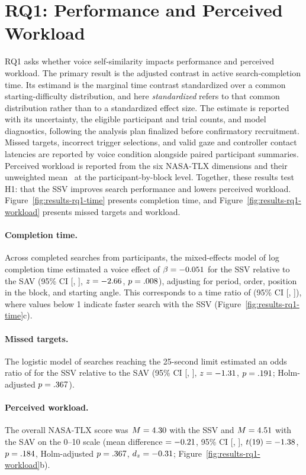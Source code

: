 \section{RQ1: Performance and Perceived Workload}
RQ1 asks whether voice self-similarity impacts performance and perceived workload. The primary result is the adjusted contrast in active search-completion time. Its estimand is the marginal time contrast standardized over a common starting-difficulty distribution, and here \emph{standardized} refers to that common distribution rather than to a standardized effect size. The estimate is reported with its uncertainty, the eligible participant and trial counts, and model diagnostics, following the analysis plan finalized before confirmatory recruitment. Missed targets, incorrect trigger selections, and valid gaze and controller contact latencies are reported by voice condition alongside paired participant summaries. Perceived workload is reported from the six NASA-TLX dimensions and their unweighted mean~\cite{hart1988nasatlx} at the participant-by-block level. Together, these results test H1: that the SSV improves search performance and lowers perceived workload. Figure~\ref{fig:results-rq1-time} presents completion time, and Figure~\ref{fig:results-rq1-workload} presents missed targets and workload.

\paragraph{Completion time.} Across \resTimeObs{} completed searches from \resN{} participants, the mixed-effects model of log completion time estimated a voice effect of $\beta = -0.051$ for the SSV relative to the SAV (95\% CI [\resTimeLo, \resTimeHi], $z = -2.66$, $p = .008$), adjusting for period, order, position in the block, and starting angle. This corresponds to a time ratio of \resTimeRatio{} (95\% CI [\resTimeRatioLo, \resTimeRatioHi]), where values below 1 indicate faster search with the SSV (Figure~\ref{fig:results-rq1-time}c).

\paragraph{Missed targets.} The logistic model of searches reaching the 25-second limit estimated an odds ratio of \resMissOR{} for the SSV relative to the SAV (95\% CI [\resMissORLo, \resMissORHi], $z = -1.31$, $p = .191$; Holm-adjusted $p = .367$).

\paragraph{Perceived workload.} The overall NASA-TLX score was $M = 4.30$ with the SSV and $M = 4.51$ with the SAV on the 0--10 scale (mean difference $= -0.21$, 95\% CI [\resTlxLo, \resTlxHi], $t(19) = -1.38$, $p = .184$, Holm-adjusted $p = .367$, $d_z = -0.31$; Figure~\ref{fig:results-rq1-workload}b).

